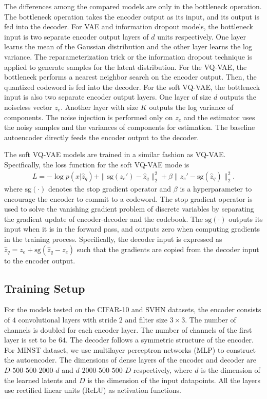 \documentclass[letterpaper]{article} %
\begin{document}
The differences among the compared models are only in the bottleneck operation. The bottleneck operation takes the encoder output as its input, and its output is fed into the decoder. For VAE and information dropout models, the bottleneck input is two separate encoder output layers of $d$ units respectively. One layer learns the mean of the Gaussian distribution and the other layer learns the log variance. The reparameterization trick or the information dropout technique is applied to generate samples for the latent distribution. For the VQ-VAE, the bottleneck performs a nearest neighbor search on the encoder output. Then, the quantized codeword is fed into the decoder. For the soft VQ-VAE, the bottleneck input is also two separate encoder output layers. One layer of size $d$ outputs the noiseless vector $z_e$. Another layer with size $K$ outputs the log variance of components. The noise injection is performed only on $z_e$ and the estimator uses the noisy samples and the variances of components for estimation. The baseline autoencoder directly feeds the encoder output to the decoder. 

 The soft VQ-VAE models are trained in a similar fashion as VQ-VAE. Specifically, the loss function for the soft VQ-VAE mode is
\begin{equation}
	\label{eq:loss1}
	\begin{split}
	L = -\log p(x|\hat{z}_q)+ \|\text{sg}\left(z_e'\right)-\hat{z}_q\|_2^2 + \beta\|z_e'- \text{sg}(\hat{z}_q)\|_2^2.
	\end{split}
\end{equation}
where $\text{sg}(\cdot)$ denotes the stop gradient operator and $\beta$ is a hyperparameter to encourage the encoder to commit to a codeword. The stop gradient operator is used to solve the vanishing gradient problem of discrete variables by separating the gradient update of encoder-decoder and the codebook.
The $\text{sg}(\cdot)$ outputs its input when it is in the
forward pass, and outputs zero when computing gradients in the training process.
Specifically, the decoder input is expressed as $\hat{z}_q = z_e + \text{sg}(\hat{z}_q-z_e)$ such that the gradients are copied from the decoder input to the encoder output.
\subsection{Training Setup}
  For the models tested on the CIFAR-10 and SVHN datasets, the encoder consists of $4$ convolutional layers with stride $2$ and filter size $3 \times 3$. The number of channels is doubled for each encoder layer. The number of channels of the first layer is set to be $64$. The decoder follows a symmetric structure of the encoder. For MINST dataset, we use multilayer perceptron networks (MLP) to construct the autoencoder. The dimensions of dense layers of the encoder and decoder are $D$-$500$-$500$-$2000$-$d$ and $d$-$2000$-$500$-$500$-$D$ respectively, where $d$ is the dimension of the learned latents and $D$ is the dimension of the input datapoints. All the layers use rectified linear units (ReLU) as activation functions. 
  
\end{document}
